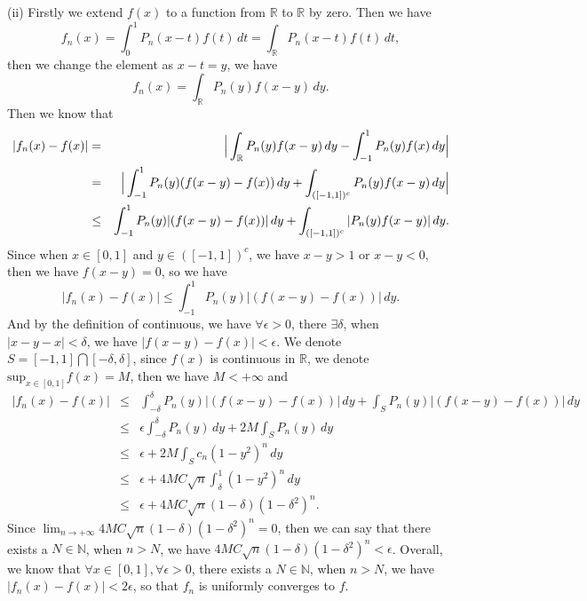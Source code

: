 \documentclass[12pt]{article}
\begin{document}
(ii) Firstly we extend $f(x)$ to a function from $\mathbb{R}$ to $\mathbb{R}$ by zero. Then we have
\begin{equation*}
    f_{n}(x) = \int_{0}^{1} P_{n}(x-t) f(t) \, d t = \int_{\mathbb{R}}^{} P_{n}(x-t) f(t) \, d t,
\end{equation*}
then we change the element as $x - t = y$, we have
\begin{equation*}
    f_{n}(x) = \int_{\mathbb{R}}^{} P_{n}(y) f(x - y) \, d y.
\end{equation*}
Then we know that
\begin{eqnarray*}
|f_{n}(x) - f(x)| &=& \Big{|}\int_{\mathbb{R}}^{} P_{n}(y) f(x - y) \, d y - \int_{-1}^{1} P_{n}(y) f(x) \, d y \Big{|}  \\
&=& \Big{|} \int_{-1}^{1} P_{n}(y) (f(x - y) - f(x)) \, d y + \int_{([-1,1])^{c}}^{} P_{n}(y) f(x-y) \, d y \Big{|} \\
&\leq& \int_{-1}^{1} P_{n}(y) | (f(x - y) - f(x))| \, d y + \int_{([-1,1])^{c}}^{} |P_{n}(y) f(x-y)| \, d y.
\end{eqnarray*}
Since when $x \in [0, 1]$ and $y \in ([-1, 1])^{c}$, we have $x - y > 1$ or $x - y < 0$, then we have $f(x -y) = 0$, so we have
\begin{equation*}
    |f_{n}(x) - f(x)| \leq \int_{-1}^{1} P_{n}(y) | (f(x - y) - f(x))| \, d y.
\end{equation*}
And by the definition of continuous, we have $\forall \epsilon > 0$, there $\exists \delta$, when $|x - y -x| < \delta$, we have $|f(x-y) - f(x)| < \epsilon$. We denote $S = [-1,1] \bigcap [-\delta, \delta]$, since $f(x)$ is continuous in $\mathbb{R}$, we denote $\text{sup}_{x \in [0, 1]} f(x) = M$, then we have $M < + \infty$ and
\begin{eqnarray*}
|f_{n}(x) - f(x)| &\leq& \int_{-\delta}^{\delta} P_{n}(y) | (f(x - y) - f(x))| \, d y  + \int_{S}^{} P_{n}(y) | (f(x - y) - f(x))| \, d y  \\
&\leq& \epsilon \int_{-\delta}^{\delta} P_{n}(y) \, d y  + 2M \int_{S}^{} P_{n}(y) \, d y   \\
&\leq& \epsilon + 2M \int_{S}^{} c_{n} (1 - y^{2})^{n} \, d y   \\
&\leq& \epsilon + 4M C \sqrt{n} \int_{\delta}^{1} (1 - y^{2})^{n} \, d y   \\
&\leq& \epsilon + 4M C \sqrt{n} (1 - \delta)(1 - \delta^{2})^{n}.
\end{eqnarray*}
Since $\lim_{n \to + \infty} 4M C \sqrt{n} (1 - \delta)(1 - \delta^{2})^{n} = 0 $, then we can say that there exists a $N \in \mathbb{N}$, when $n > N$, we have $4M C \sqrt{n} (1 - \delta)(1 - \delta^{2})^{n} < \epsilon$. Overall, we know that $\forall x \in [0, 1], \forall \epsilon > 0$, there exists a $N \in \mathbb{N}$, when $n > N$, we have $|f_{n}(x) - f(x)| < 2 \epsilon$, so that $f_{n}$ is uniformly converges to $f$.
\end{document}
